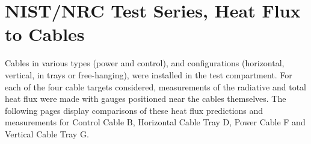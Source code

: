 %



\clearpage

\section{NIST/NRC Test Series, Heat Flux to Cables}

Cables in various types (power and control), and configurations (horizontal, vertical, in trays or free-hanging), were installed in
the test compartment. For each of the four cable targets considered, measurements of the radiative and total heat flux were made with
gauges positioned near the cables themselves.  The following pages display comparisons of these heat flux predictions and measurements for
Control Cable B, Horizontal Cable Tray D, Power Cable F and Vertical Cable Tray G.

